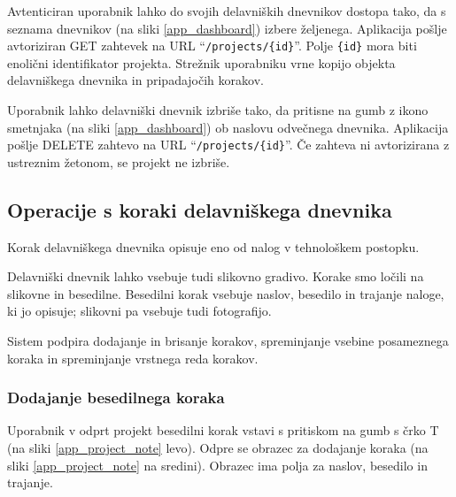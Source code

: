 \documentclass[a4paper, 12pt]{book}
\begin{document}
Avtenticiran uporabnik lahko do svojih delavniških dnevnikov dostopa tako, da s seznama dnevnikov (na sliki \ref{app_dashboard}) izbere željenega.
Aplikacija pošlje avtoriziran GET zahtevek na URL \enquote{\texttt{/projects/\{id\}}}.
Polje \texttt{\{id\}} mora biti enolični identifikator projekta.
Strežnik uporabniku vrne kopijo objekta delavniškega dnevnika in pripadajočih korakov.


Uporabnik lahko delavniški dnevnik izbriše tako, da pritisne na gumb z ikono smetnjaka (na sliki \ref{app_dashboard}) ob naslovu odvečnega dnevnika.
Aplikacija pošlje DELETE zahtevo na URL \enquote{\texttt{/projects/\{id\}}}.
Če zahteva ni avtorizirana z ustreznim žetonom, se projekt ne izbriše.



\subsection{Operacije s koraki delavniškega dnevnika}

Korak delavniškega dnevnika opisuje eno od nalog v tehnološkem postopku.

Delavniški dnevnik lahko vsebuje tudi slikovno gradivo.
Korake smo ločili na slikovne in besedilne.
Besedilni korak vsebuje naslov, besedilo in trajanje naloge, ki jo opisuje; slikovni pa vsebuje tudi fotografijo.

Sistem podpira dodajanje in brisanje korakov, spreminjanje vsebine posameznega koraka in spreminjanje vrstnega reda korakov.


\subsubsection{Dodajanje besedilnega koraka}

Uporabnik v odprt projekt besedilni korak vstavi s pritiskom na gumb s črko T (na sliki \ref{app_project_note} levo).
Odpre se obrazec za dodajanje koraka (na sliki \ref{app_project_note} na sredini).
Obrazec ima polja za naslov, besedilo in trajanje.
\end{document}
